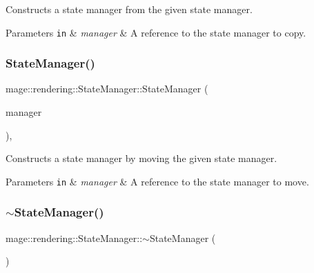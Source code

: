 Constructs a state manager from the given state manager.


\begin{DoxyParams}[1]{Parameters}
\mbox{\tt in}  & {\em manager} & A reference to the state manager to copy. \\
\hline
\end{DoxyParams}
\mbox{\label{classmage_1_1rendering_1_1_state_manager_ab5a87ec8d14f9b249685b52e159888b2}} 
\subsubsection{\texorpdfstring{State\+Manager()}{StateManager()}\hspace{0.1cm}{\footnotesize\ttfamily [3/3]}}
{\footnotesize\ttfamily mage\+::rendering\+::\+State\+Manager\+::\+State\+Manager (\begin{DoxyParamCaption}\item[{\mbox{\hyperlink{classmage_1_1rendering_1_1_state_manager}{State\+Manager}} \&\&}]{manager }\end{DoxyParamCaption})\hspace{0.3cm}{\ttfamily [default]}, {\ttfamily [noexcept]}}

Constructs a state manager by moving the given state manager.


\begin{DoxyParams}[1]{Parameters}
\mbox{\tt in}  & {\em manager} & A reference to the state manager to move. \\
\hline
\end{DoxyParams}
\mbox{\label{classmage_1_1rendering_1_1_state_manager_a774d3147717773d6dce1f388bc960f87}} 
\subsubsection{\texorpdfstring{$\sim$\+State\+Manager()}{~StateManager()}}
{\footnotesize\ttfamily mage\+::rendering\+::\+State\+Manager\+::$\sim$\+State\+Manager (\begin{DoxyParamCaption}{ }\end{DoxyParamCaption})\hspace{0.3cm}{\ttfamily [default]}}

